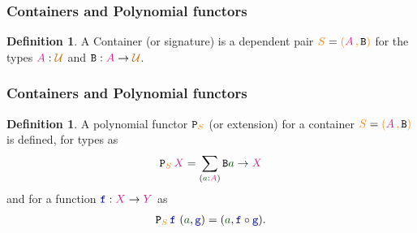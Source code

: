 \documentclass[xelatex,mathserif,serif,notheorems]{beamer} %
\theoremstyle{plain} %
\theoremstyle{definition}
\newtheorem{defn}[thm]{Definition}%
\theoremstyle{remark}
\newcommand*{\term}[1]{\textcolor{green!30!black}{#1}} %
\newcommand*{\type}[1]{\textcolor{magenta!90!black}{#1}}
\newcommand*{\container}[1]{\textcolor{orange}{#1}}
\newcommand*{\containerpair}[2]{\ensuremath{\colorlet{savedleftcolor}{.}\color{orange}\left(\color{savedleftcolor}#1\,\textcolor{orange}{\mathbf{,}}\,#2\color{orange}\right)\color{savedleftcolor}}}
\newcommand*{\universe}[1]{\textcolor{orange!80!black}{#1}}
\newcommand*{\function}[1]{\textcolor{blue!60!black}{\ensuremath{\mathtt{#1}}}}
\newcommand*{\typeformer}[1]{\ensuremath{\mathtt{#1}}}
\newcommand*{\functor}[1]{\ensuremath{\mathbf{\mathtt{#1}}}}
\newcommand{\setlengths}{
  \setlength{\abovedisplayskip}{4pt}
  \setlength{\belowdisplayskip}{4pt}
  \setlength{\abovedisplayshortskip}{2pt}
  \setlength{\belowdisplayshortskip}{2pt}
}
\begin{document}
\begin{frame}[fragile]
  \frametitle{Containers and Polynomial functors}
  \begin{defn}\setlengths
    A Container (or signature) is a dependent pair \(\container{S} = \containerpair{\type{A}}{\typeformer{B}}\) for the types \(\type{A} : \universe{\mathcal{U}}\) and \(\typeformer{B} : \type{A} \rightarrow \universe{\mathcal{U}}\). 
  \end{defn}
  \begin{figure}
    \centering
  \end{figure}
\end{frame}

\begin{frame}[fragile]
  \frametitle{Containers and Polynomial functors}
  \begin{defn}\setlengths
    A polynomial functor \(\functor{P}_{\container{S}}\) (or extension) for a container \(\container{S} = \containerpair{\type{A}}{\typeformer{B}}\) is defined, for types as
    \begin{equation}
      \functor{P}_{\container{S}}\,\type{X} = \sum_{(\term{a} : \type{A})} \typeformer{B}\term{a} \rightarrow \type{X}
    \end{equation}
    and for a function \(\function{f} : \type{X} \rightarrow \type{Y}\) as
    \begin{equation}
      \begin{aligned}
        \functor{P}_{\container{S}}\,\function{f}~(\term{a},\function{g}) = (\term{a}, \function{f} \circ \function{g}).
      \end{aligned}
    \end{equation}
  \end{defn}
\end{frame}
\end{document}
